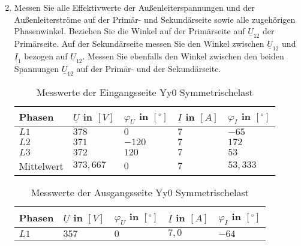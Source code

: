 \begin{enumerate}[label=\alph*)]
  \setcounter{enumi}{1}
  \item Messen Sie alle Effektivwerte der Außenleiterspannungen und der
        Außenleiterströme auf der Primär- und Sekundärseite sowie alle zugehörigen
        Phasenwinkel. Beziehen Sie die Winkel auf der Primärseite auf $\underline
          U_{12}$ der Primärseite. Auf der Sekundärseite messen Sie den Winkel zwischen
        $\underline U_{12}$ und $\underline I_1$ bezogen auf $\underline U_{12}$.
        Messen Sie ebenfalls den Winkel zwischen den beiden Spannungen $\underline
          U_{12}$ auf der Primär- und der Sekundärseite.

        \begin{table}[h!]
          \caption{Messwerte der Eingangsseite Yy0 Symmetrischelast}
          \centering
          \begin{tabular}{lllll}
            \\ \hline
            Phasen     & $\underline{U}$ in $[V]$ & $\varphi_{U}$ in $[^\circ]$ & $\underline{I}$ in $[A]$ & $\varphi_{I}$ in $[^\circ]$ \\ \hline
            $L1$       & $378$                    & $0$                         & $7$                      & $-65$                       \\
            $L2$       & $371$                    & $-120$                      & $7$                      & $172$                       \\
            $L3$       & $372$                    & $120$                       & $7$                      & $53$                        \\ \hline
            Mittelwert & $373,667$                & $0$                         & $7$                      & $53,333$                    \\ \hline\hline
          \end{tabular}
        \end{table}
        \begin{table}[h!]
          \centering
          \caption{Messwerte der Ausgangsseite Yy0 Symmetrischelast}
          \begin{tabular}{lllll}
            \\ \hline
            Phasen     & $\underline{U}$ in $[V]$ & $\varphi_{U}$ in $[^\circ]$ & $\underline{I}$ in $[A]$ & $\varphi_{I}$ in $[^\circ]$ \\ \hline
            $L1$       & $357$                    & $0$                         & $7,0$                    & $-64$                       \\

\end{tabular}
\end{table}
\end{enumerate}
